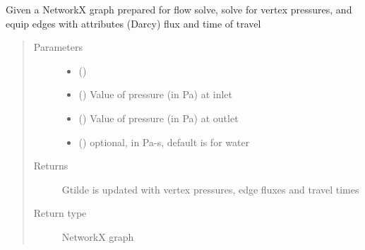 \documentclass[letterpaper,10pt,english]{sphinxmanual}
\begin{document}
\begin{fulllineitems}
\label{\detokenize{pydfnworks:pydfnworks.dfnGraph.graph_flow.solve_flow_on_graph}}
Given a NetworkX graph prepared  for flow solve, solve for vertex pressures, and equip edges with attributes (Darcy) flux  and time of travel
\begin{quote}\begin{description}
\item[{Parameters}] \leavevmode\begin{itemize}
\item {} 
 () \textendash{} 

\item {} 
 () \textendash{} Value of pressure (in Pa) at inlet

\item {} 
 () \textendash{} Value of pressure (in Pa) at outlet

\item {} 
 () \textendash{} optional, in Pa-s, default is for water

\end{itemize}

\item[{Returns}] \leavevmode
{} \textendash{} Gtilde is updated with vertex pressures, edge fluxes and travel times

\item[{Return type}] \leavevmode
NetworkX graph

\end{description}\end{quote}

\end{fulllineitems}

\label{\detokenize{pydfnworks:module-pydfnworks.dfnGraph.graph_transport}}
\end{document}
